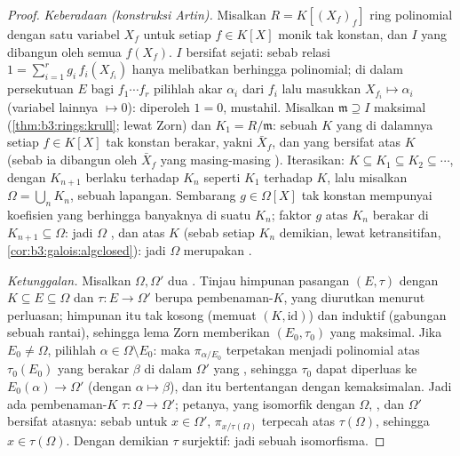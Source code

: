 \begin{proof}
\emph{Keberadaan (konstruksi Artin).} Misalkan $R = K[(X_f)_f]$
ring polinomial dengan satu variabel $X_f$ untuk setiap
$f \in K[X]$ monik tak konstan, dan $I$  yang dibangun oleh semua
$f(X_f)$.  $I$ bersifat sejati: sebab relasi $1 = \sum_{i=1}^r g_i\,
f_i(X_{f_i})$ hanya melibatkan berhingga polinomial; di dalam
 persekutuan $E$ bagi $f_1\cdots f_r$ pilihlah akar $\alpha_i$ dari
$f_i$ lalu masukkan $X_{f_i} \mapsto \alpha_i$ (variabel lainnya
$\mapsto 0$): diperoleh $1 = 0$, mustahil. Misalkan $\mathfrak m \supseteq I$
maksimal (\cref{thm:b3:rings:krull}; lewat Zorn) dan $K_1 = R/\mathfrak
m$: sebuah  $K$ yang di dalamnya setiap $f \in
K[X]$ tak konstan berakar, yakni $\bar X_f$, dan yang bersifat  atas
$K$ (sebab ia dibangun oleh $\bar X_f$ yang masing-masing ).
Iterasikan: $K \subseteq K_1 \subseteq K_2 \subseteq \cdots$, dengan
$K_{n+1}$ berlaku terhadap $K_n$ seperti $K_1$ terhadap $K$, lalu misalkan $\Omega =
\bigcup_n K_n$, sebuah lapangan. Sembarang $g \in \Omega[X]$ tak konstan mempunyai
koefisien yang berhingga banyaknya di suatu $K_n$; faktor 
$g$ atas $K_n$ berakar di $K_{n+1} \subseteq
\Omega$: jadi $\Omega$ , dan  atas
$K$ (sebab setiap $K_n$ demikian, lewat ketransitifan,
\cref{cor:b3:galois:algclosed}): jadi $\Omega$ merupakan .

\emph{Ketunggalan.} Misalkan $\Omega, \Omega'$ dua . Tinjau himpunan pasangan $(E, \tau)$ dengan $K
\subseteq E \subseteq \Omega$ dan $\tau\colon E \to \Omega'$ berupa
pembenaman-$K$, yang diurutkan menurut perluasan; himpunan itu tak kosong (memuat $(K,
\mathrm{id})$) dan induktif (gabungan sebuah rantai), sehingga lema Zorn memberikan
$(E_0, \tau_0)$ yang maksimal. Jika $E_0 \neq \Omega$, pilihlah $\alpha \in
\Omega\setminus E_0$: maka $\pi_{\alpha/E_0}$ terpetakan menjadi polinomial
atas $\tau_0(E_0)$ yang berakar $\beta$ di dalam $\Omega'$ yang , sehingga $\tau_0$ dapat diperluas ke $E_0(\alpha) \to
\Omega'$ (dengan $\alpha \mapsto \beta$), dan itu bertentangan dengan kemaksimalan. Jadi
ada pembenaman-$K$ $\tau \colon \Omega \to \Omega'$; petanya,
yang isomorfik dengan $\Omega$, , dan
$\Omega'$ bersifat  atasnya: sebab untuk $x \in \Omega'$,
$\pi_{x/\tau(\Omega)}$ terpecah atas $\tau(\Omega)$, sehingga $x \in
\tau(\Omega)$. Dengan demikian $\tau$ surjektif: jadi sebuah isomorfisma.
\end{proof}

